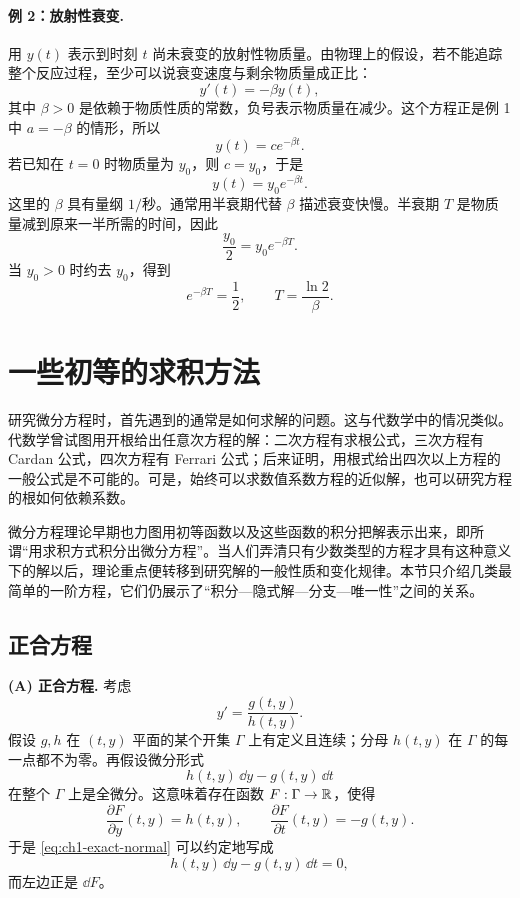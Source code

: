\paragraph{例 2：放射性衰变.}
用 \(y(t)\) 表示到时刻 \(t\) 尚未衰变的放射性物质量。由物理上的假设，若不能追踪整个反应过程，至少可以说衰变速度与剩余物质量成正比：
\begin{equation}
 y'(t)=-\beta y(t),
 \label{eq:ch1-radioactive}
\end{equation}
其中 \(\beta>0\) 是依赖于物质性质的常数，负号表示物质量在减少。这个方程正是例 1 中 \(a=-\beta\) 的情形，所以
\[
 y(t)=ce^{-\beta t}.
\]
若已知在 \(t=0\) 时物质量为 \(y_0\)，则 \(c=y_0\)，于是
\[
 y(t)=y_0e^{-\beta t}.
\]
这里的 \(\beta\) 具有量纲 \(1/\text{秒}\)。通常用半衰期代替 \(\beta\) 描述衰变快慢。半衰期 \(T\) 是物质量减到原来一半所需的时间，因此
\[
 \frac{y_0}{2}=y_0e^{-\beta T}.
\]
当 \(y_0>0\) 时约去 \(y_0\)，得到
\[
 e^{-\beta T}=\frac12,
 \qquad
 T=\frac{\ln 2}{\beta}.
\]

\section{一些初等的求积方法}

研究微分方程时，首先遇到的通常是如何求解的问题。这与代数学中的情况类似。代数学曾试图用开根给出任意次方程的解：二次方程有求根公式，三次方程有 Cardan 公式，四次方程有 Ferrari 公式；后来证明，用根式给出四次以上方程的一般公式是不可能的。可是，始终可以求数值系数方程的近似解，也可以研究方程的根如何依赖系数。

微分方程理论早期也力图用初等函数以及这些函数的积分把解表示出来，即所谓“用求积方式积分出微分方程”。当人们弄清只有少数类型的方程才具有这种意义下的解以后，理论重点便转移到研究解的一般性质和变化规律。本节只介绍几类最简单的一阶方程，它们仍展示了“积分—隐式解—分支—唯一性”之间的关系。

\subsection{正合方程}

\textbf{(A) 正合方程.} 考虑
\begin{equation}
 y'=\frac{g(t,y)}{h(t,y)}.
 \label{eq:ch1-exact-normal}
\end{equation}
假设 \(g,h\) 在 \((t,y)\) 平面的某个开集 \(\Gamma\) 上有定义且连续；分母 \(h(t,y)\) 在 \(\Gamma\) 的每一点都不为零。再假设微分形式
\[
 h(t,y)\,\dd y-g(t,y)\,\dd t
\]
在整个 \(\Gamma\) 上是全微分。这意味着存在函数 \(F:\Gamma\to\mathbb R\)，使得
\begin{equation}
 \frac{\partial F}{\partial y}(t,y)=h(t,y),
 \qquad
 \frac{\partial F}{\partial t}(t,y)=-g(t,y).
 \label{eq:ch1-exact-potential}
\end{equation}
于是 \eqref{eq:ch1-exact-normal} 可以约定地写成
\[
 h(t,y)\,\dd y-g(t,y)\,\dd t=0,
\]
而左边正是 \(\dd F\)。

